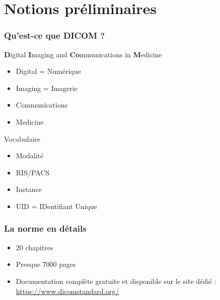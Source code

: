 \section{Notions pr\'eliminaires}

	\frame
	{
		\frametitle{Qu'est-ce que DICOM ?}
		
		\begin{block}{\textbf{D}igital \textbf{I}maging and \textbf{Co}mmunications in \textbf{M}edicine}
		\begin{itemize}
			\item Digital = Num\'erique
		    	\item Imaging = Imagerie
		    	\item Communications
		    	\item Medicine
			\end{itemize}
		\end{block}
		
		\begin{block}{Vocabulaire}
		\begin{itemize}
			\item Modalit\'e
			\item RIS/PACS
			\item Instance
			\item UID = IDentifiant Unique
		\end{itemize}
		\end{block}
	}
	
	\frame
	{
		\frametitle{La norme en d\'etails}
		\begin{itemize}
			\item $20$ chapitres
			\item Presque $7000$ pages
			\item Documentation compl\`ete gratuite et disponible sur le site d\'edi\'e : \url{https://www.dicomstandard.org/}	
		\end{itemize}
	}

